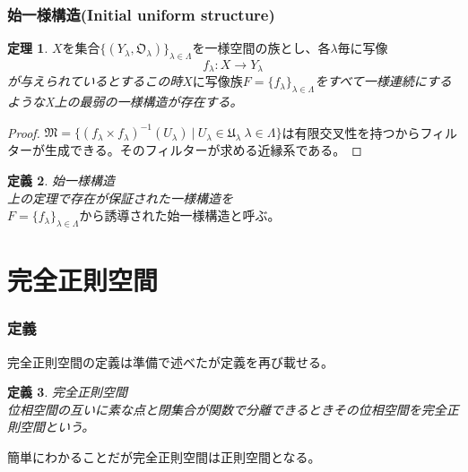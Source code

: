 \documentclass[leqno]{jsarticle}
\newtheorem{thm}{定理}
\newtheorem{df}[thm]{定義}
\begin{document}
\section{始一様構造(Initial uniform structure)}
\begin{thm}
$Xを集合\{(Y_{\lambda},\mathfrak{O}_{\lambda})\}_{\lambda \in \Lambda}を一様空間の族とし、各\lambda 毎に写像$
\[
f_{\lambda}:X\rightarrow Y_{\lambda}
\]が与えられているとするこの時$Xに写像族F=\{f_{\lambda}\}_{\lambda \in \Lambda}$をすべて一様連続にするようなX上の最弱の一様構造が存在する。
\end{thm}
\begin{proof}$
\mathfrak{M}=\{(f_{\lambda}\times f_{\lambda})^{-1}(U_{\lambda})\ |\ U_{\lambda}\in \mathfrak{U}_{\lambda}\ \lambda\in \Lambda\}$は有限交叉性を持つからフィルターが生成できる。そのフィルターが求める近縁系である。
\end{proof}
\begin{df}始一様構造\\
上の定理で存在が保証された一様構造を$F=\{f_{\lambda}\}_{\lambda \in \Lambda}から誘導された始一様構造と呼ぶ。$
\end{df}



\newpage
\part{完全正則空間}
\section{定義}完全正則空間の定義は準備で述べたが定義を再び載せる。
\begin{df}完全正則空間\\
位相空間の互いに素な点と閉集合が関数で分離できるときその位相空間を完全正則空間という。
\end{df}
簡単にわかることだが完全正則空間は正則空間となる。
\end{document}
